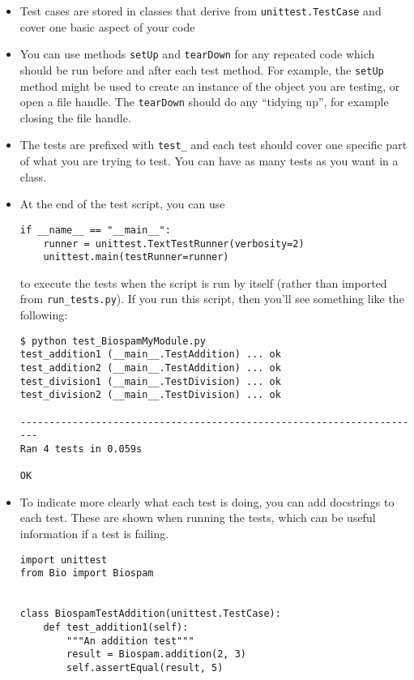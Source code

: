 \begin{itemize}
  \item Test cases are stored in classes that derive from
    \verb|unittest.TestCase| and cover one basic aspect of your code

  \item You can use methods \verb|setUp| and \verb|tearDown| for any repeated
    code which should be run before and after each test method.  For example,
    the \verb|setUp| method might be used to create an instance of the object
    you are testing, or open a file handle.  The \verb|tearDown| should do any
    ``tidying up'', for example closing the file handle.

  \item The tests are prefixed with \verb|test_| and each test should cover
    one specific part of what you are trying to test. You can have as
    many tests as you want in a class.

  \item At the end of the test script, you can use
\begin{verbatim}
if __name__ == "__main__":
    runner = unittest.TextTestRunner(verbosity=2)
    unittest.main(testRunner=runner)
\end{verbatim}
        to execute the tests when the script is run by itself (rather than
        imported from \verb|run_tests.py|).
        If you run this script, then you'll see something like the following:

\begin{verbatim}
$ python test_BiospamMyModule.py
test_addition1 (__main__.TestAddition) ... ok
test_addition2 (__main__.TestAddition) ... ok
test_division1 (__main__.TestDivision) ... ok
test_division2 (__main__.TestDivision) ... ok

----------------------------------------------------------------------
Ran 4 tests in 0.059s

OK
\end{verbatim}

  \item To indicate more clearly what each test is doing, you can add
        docstrings to each test.  These are shown when running the tests,
        which can be useful information if a test is failing.

\begin{verbatim}
import unittest
from Bio import Biospam


class BiospamTestAddition(unittest.TestCase):
    def test_addition1(self):
        """An addition test"""
        result = Biospam.addition(2, 3)
        self.assertEqual(result, 5)


\end{verbatim}
\end{itemize}
